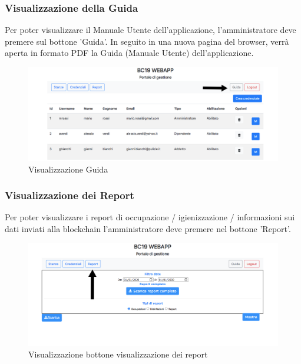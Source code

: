 \subsubsection{Visualizzazione della Guida}
Per poter visualizzare il Manuale Utente dell'applicazione, l'amministratore deve premere sul bottone 'Guida'. In seguito in una nuova pagina del browser, verrà aperta in formato PDF la Guida (Manuale Utente) dell'applicazione.
\begin{figure}[H]
	\centering
	\includegraphics[width=15cm]{res/images/guida.jpg}
	\caption{Visualizzazione Guida}
\end{figure}
\newpage
\subsubsection{Visualizzazione dei Report}
Per poter visualizzare i report di occupazione / igienizzazione / informazioni sui dati inviati alla blockchain l'amministratore deve premere nel bottone 'Report'.
\begin{figure}[H]
	\centering
	\includegraphics[width=15cm]{res/images/bottoneReport.png}
	\caption{Visualizzazione bottone visualizzazione dei report}
\end{figure}

